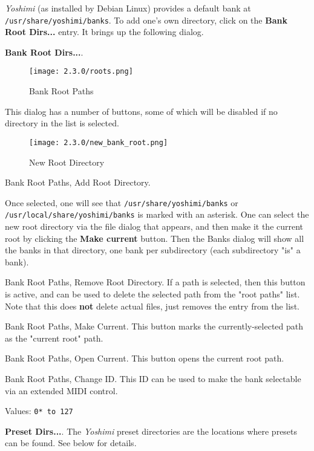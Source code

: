 \textsl{Yoshimi} (as installed by Debian Linux) provides a default bank at
   \texttt{/usr/share/yoshimi/banks}.
   To add one's own directory, click on the \textbf{Bank Root Dirs...} entry.
   It brings up the following dialog.

   \begin{enumber}
      \item \textbf{Bank Root Dirs...}.

\begin{figure}[H]
   \centering
   \texttt{[image: 2.3.0/roots.png]}
   \caption{Bank Root Paths}
   \label{fig:bank_root_paths}
\end{figure}

   This dialog has a number of buttons, some of which will be disabled if no
   directory in the list is selected.

\begin{figure}[H]
   \centering
   \texttt{[image: 2.3.0/new\_bank\_root.png]}
   \caption{New Root Directory}
   \label{fig:new_root_directory}
\end{figure}

   \setcounter{ItemCounter}{0}      %

   Bank Root Paths, Add Root Directory.

   Once selected, one will see that
   \texttt{/usr/share/yoshimi/banks} or
   \texttt{/usr/local/share/yoshimi/banks}
   is marked with an asterisk.  One can select the new root directory via the
   file dialog that appears, and then make it the current root by clicking the
   \textbf{Make current} button.  Then the Banks dialog will show all the banks
   in that directory, one bank per subdirectory (each subdirectory "is" a
   bank).

   Bank Root Paths, Remove Root Directory.
   If a path is selected, then this button is active, and can be used to
   delete the selected path from the "root paths" list. Note that this does
   \textbf{not} delete actual files, just removes the entry from the list.

   Bank Root Paths, Make Current.
   This button marks the currently-selected path as the "current root" path.

   Bank Root Paths, Open Current.
   This button opens the current root path.

   Bank Root Paths, Change ID.
   This ID can be used to make the bank selectable via an extended MIDI
   control.

   Values: \texttt{0* to 127}


      \item \textbf{Preset Dirs...}.
         The \textsl{Yoshimi} preset directories are the locations where
         presets can be found.  See below for details.
   \end{enumber}

